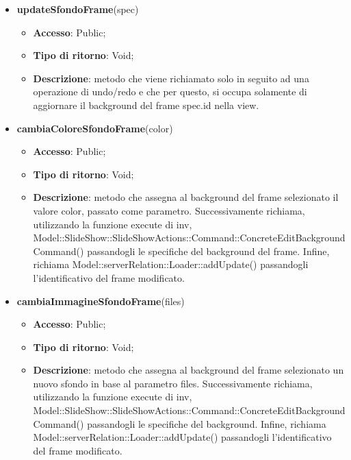 {{\begin{itemize}
\begin{itemize}
			\item \textbf{Descrizione}: metodo che rimuove colore e sfondo dal background e che successivamente, utilizzando la funzione execute di inv, richiama Model::\-SlideShow::\-SlideShowActions::\-Command::\-ConcreteBackgroundInsertCommand() passandogli le specifiche del background. Infine, richiama Model::\-serverRelation::\-Loader::\-addUpdate() passandogli l'identificativo dell'elemento background modificato.
		\end{itemize}
		\item \textbf{updateSfondoFrame}(spec)
		\begin{itemize}
			\item \textbf{Accesso}: Public;
			\item \textbf{Tipo di ritorno}: Void;
			\item \textbf{Descrizione}: metodo che viene richiamato solo in seguito ad una operazione di undo/redo e che per questo, si occupa solamente di aggiornare il background del frame spec.id nella view.
		\end{itemize}
		\item \textbf{cambiaColoreSfondoFrame}(color)
		\begin{itemize}
			\item \textbf{Accesso}: Public;
			\item \textbf{Tipo di ritorno}: Void;
			\item \textbf{Descrizione}: metodo che assegna al background del frame selezionato il valore color, passato come parametro. Successivamente richiama, utilizzando la funzione execute di inv, Model::\-SlideShow::\-SlideShowActions::\-Command::\-ConcreteEditBackgroundCommand() passandogli le specifiche del background del frame. Infine, richiama Model::\-serverRelation::\-Loader::\-addUpdate() passandogli l'identificativo del frame modificato.
		\end{itemize}
		\item \textbf{cambiaImmagineSfondoFrame}(files)
		\begin{itemize}
			\item \textbf{Accesso}: Public;
			\item \textbf{Tipo di ritorno}: Void;
			\item \textbf{Descrizione}: metodo che assegna al background del frame selezionato un nuovo sfondo in base al parametro files. Successivamente richiama, utilizzando la funzione execute di inv, Model::\-SlideShow::\-SlideShowActions::\-Command::\-ConcreteEditBackgroundCommand() passandogli le specifiche del background. Infine, richiama Model::\-serverRelation::\-Loader::\-addUpdate() passandogli l'identificativo del frame modificato.

\end{itemize}
\end{itemize}}}
